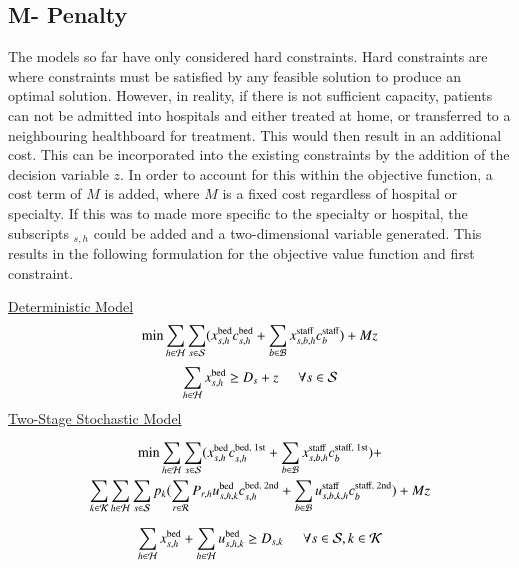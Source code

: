 \documentclass[../thesis.tex]{subfiles}
\begin{document}
\subsection{M- Penalty}
The models so far have only considered hard constraints. Hard constraints are where constraints must be satisfied by any feasible solution to produce an optimal solution. However, in reality, if there is not sufficient capacity, patients can not be admitted into hospitals and either treated at home, or transferred to a neighbouring healthboard for treatment. This would then result in an additional cost. This can be incorporated into the existing constraints by the addition of the decision variable $z$. In order to account for this within the objective function, a cost term of $M$ is added, where $M$ is a fixed cost regardless of hospital or specialty. If this was to made more specific to the specialty or hospital, the subscripts $_{s,h}$ could be added and a two-dimensional variable generated. This results in the following formulation for the objective value function and first constraint.

\underline{Deterministic Model}
\begin{equation}\label{eq:det_objective}
    \min \sum_{h\in\mathcal{H}}\sum_{s\in\mathcal{S}}(x^\textnormal{bed}_{s,h}c^\textnormal{bed}_{s,h} + \sum_{b\in\mathcal{B}}x^\textnormal{staff}_{s,b,h}c^\textnormal{staff}_{b}) + Mz
\end{equation}
\begin{equation}
    \sum_{h\in\mathcal{H}} x^\textnormal{bed}_{s,h}\geq D_{s} + z \hspace{0.5cm} \forall  s \in \mathcal{S}
\end{equation}
\underline{Two-Stage Stochastic Model}

\begin{multline}\label{eq:sto_objectiveupdate}
    \min \sum_{h\in\mathcal{H}}\sum_{s\in\mathcal{S}}(x^\textnormal{bed}_{s,h}c^\textnormal{bed, 1st}_{s,h} + \sum_{b\in\mathcal{B}}x^\textnormal{staff}_{s,b,h}c^\textnormal{staff, 1st}_{b}) +\\ 
    \sum_{k\in\mathcal{K}}\sum_{h\in\mathcal{H}}\sum_{s\in\mathcal{S}}p_{k}(\sum_{r\in\mathcal{R}} P_{r,h} u^\textnormal{bed}_{s,h,k}c^\textnormal{bed, 2nd}_{s,h} +
   \sum_{b\in\mathcal{B}} u^\textnormal{staff}_{s,b,k,h}c^\textnormal{staff, 2nd}_{b}) + Mz
\end{multline}

\begin{equation}
    \sum_{h\in\mathcal{H}} x^\textnormal{bed}_{s,h} +  \sum_{h\in\mathcal{H}} u^\textnormal{bed}_{s,h,k} \geq D_{s,k} \hspace{0.5cm} \forall s \in \mathcal{S}, k \in \mathcal{K}\\
\end{equation}
\end{document}
